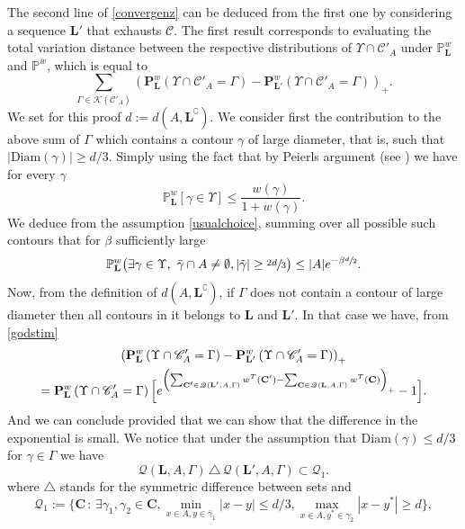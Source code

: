 \documentclass[JEP,XML,SOM,Unicode, NoFloatCountersInSection]{cedram}
\let\mathcal\mathscr
\newcommand{\sep}{\,:\,}
\numberwithin{equation}{section}
\theoremstyle{plain}
\theoremstyle{definition}
\newcommand{\Diam}{\mathrm{Diam}}
\newcommand{\cc}{\complement}
\newcommand{\cQ}{{\ensuremath{\mathcal Q}} }
\newcommand{\cC}{{\ensuremath{\mathcal C}} }
\newcommand{\cK}{{\ensuremath{\mathcal K}} }
\newcommand{\bP}{{\ensuremath{\mathbf P}} }
\newcommand{\bC}{{\ensuremath{\mathbf C}} }
\newcommand{\bL}{{\ensuremath{\mathbf L}} }
\newcommand{\bbP}{{\ensuremath{\mathbb P}} }
\newcommand{\gb}{\beta}
\newcommand{\gG}{\Gamma}
\begin{document}
The second line of \eqref{convergenz} can be deduced from the first one by considering a sequence $\bL'$ that exhausts $\cC$.
The first result corresponds to evaluating the total variation distance between the respective distributions of $\Upsilon\cap \cC'_A$ under
$\bbP^w_{\bL}$ and $\bbP^w$, which is equal to
\begin{equation*}
\sum_{\gG \in \cK(\cC'_A)} \left(\bP^w_{\bL}\left(\Upsilon \cap \cC'_A=\gG \right)- \bP^w_{\bL'}\left(\Upsilon \cap \cC'_A=\gG\right) \right)_+.
\end{equation*}
We set for this proof $d:=d(A,\bL^{\cc})$.
We consider first the contribution to the above sum of $\gG$ which contains a contour $\gamma$ of large diameter, that is, such that
$|\Diam(\gamma)|\ge d/3$.
Simply using the fact that by Peierls argument (see \eg \cite[Lem.\,4.4]{cf:part1}) we have for every $\gamma$
\begin{equation}\label{pignouf}
\bbP^{w}_{\bL}[\gamma \in \Upsilon]\le \frac{w(\gamma)}{1+w(\gamma)}.
\end{equation}
We deduce from the assumption \eqref{usualchoice}, summing over all possible such contours that for $\gb$ sufficiently large
\begin{equation*}
\bbP^w_{\bL}\bigl(\exists \gamma \in \Upsilon, \ \bar\gamma \cap A\ne \emptyset, |\tilde \gamma|\ge \sfrac{2d}{3}\bigr)\le
|A| e^{-\gb \sfrac{d}{2}}.
\end{equation*}
Now, from the definition of $d(A,\bL^{\cc})$, if $\gG$ does not contain a contour of large diameter then all contours in it belongs to $\bL$ and $\bL'$.
In that case we have, from \eqref{godstim}
\begin{multline*}
\left(\bP^w_{\bL}\left(\Upsilon \cap \cC'_A=\gG \right)- \bP^w_{\bL'}\left(\Upsilon \cap \cC'_A=\gG\right) \right)_+
\\= \bP^w_{\bL}\left(\Upsilon \cap \cC'_A=\gG \right) \Bigl[ e^{ \left(\sum_{\bC'\in \cQ(\bL',A,\gG)} w^T(\bC')-
\sum_{\bC \in \cQ(\bL,A,\gG)} w^T(\bC)\right)_+ }-1 \Bigr].
\end{multline*}
And we can conclude provided that we can show that the difference in the exponential is small.
We notice that under the assumption that $\Diam(\gamma)\le d/3$ for $\gamma\in \gG$ we have
\begin{equation*}
\cQ(\bL,A,\gG)\,\triangle\,\cQ(\bL',A,\gG)\subset \cQ_1.
\end{equation*}
where $\triangle$ stands for the symmetric difference between sets and
\begin{equation*}
\cQ_1:=\{ \bC \sep \exists \gamma_1,\gamma_2 \in \bC, \min_{x\in A, y\in \bar \gamma_1} |x-y|\le d/3, \max_{x\in A, y^*\in \gamma_2}|x-y^*|\ge d \},
\end{equation*}
\end{document}
